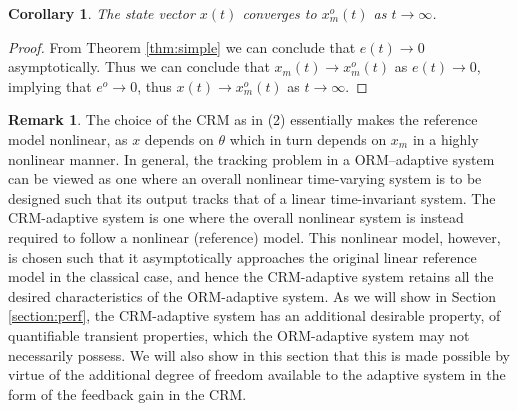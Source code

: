 \documentclass[10pt,journal]{IEEEtran}
\theoremstyle{plain}%
\newtheorem{cor}[thm]{Corollary}
\theoremstyle{definition}
\newtheorem{rem}{Remark}
\newcommand{\ben}[0]{\begin{equation*}}
\newcommand{\een}[0]{\end{equation*}}
\newcommand{\norms}[1]{\lVert#1\rVert}
\newcommand{\normB}[0]{\norms}
\let\norm=\normB
\begin{document}
\begin{cor}
The state vector $x(t)$ converges to $x_m^o(t)$ as $t\rightarrow \infty$.
\end{cor}
\begin{proof}
From Theorem \ref{thm:simple} we can conclude that $e(t)\rightarrow0$ asymptotically. Thus we can conclude that  $x_m(t) \rightarrow x_m^o(t)$ as $e(t)\rightarrow 0$, implying that $e^o\rightarrow 0$, thus $x(t)\rightarrow x_m^o(t)$ as $t\rightarrow \infty$. 
\end{proof}

\begin{rem}
The choice of the CRM as in (2) essentially makes the reference model nonlinear, as $x$ depends on $\theta$ which in turn depends on $x_m$ in  a highly nonlinear manner. In general, the tracking problem in a ORM--adaptive system can be viewed as one where an overall nonlinear time-varying system is to be designed such that its output tracks that of a linear time-invariant system. The CRM-adaptive system is one where the overall nonlinear system is instead required to follow a nonlinear (reference) model. This nonlinear model, however, is chosen such that it asymptotically approaches the original linear reference model in the classical case, and hence the CRM-adaptive system retains all the desired characteristics of the ORM-adaptive system. As we will show in Section \ref{section:perf}, the CRM-adaptive system has an additional desirable property, of quantifiable transient properties, which the ORM-adaptive system may not necessarily possess. We will also show in this section that this is made possible by virtue of the additional degree of freedom available to the adaptive system in the form of the feedback gain in the CRM.
\end{rem}
\end{document}
